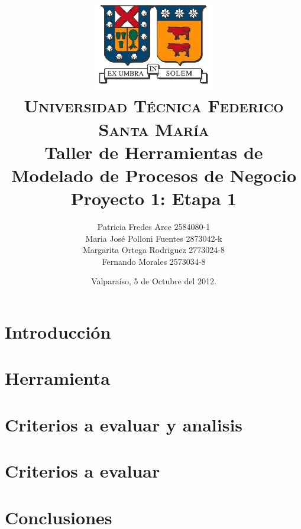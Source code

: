 \documentclass[letterpaper,12pt,spanish]{article}
\author{
{\normalsize Patricia Fredes Arce 2584080-1}\\
{\normalsize Maria José Polloni Fuentes 2873042-k}\\
{\normalsize Margarita Ortega Rodriguez 2773024-8}\\
{\normalsize Fernando Morales 2573034-8}\\
}
\title{\vspace{-1cm}\includegraphics[scale=0.5]{imagenes/logo_usm.JPG}\\\vspace{-0.2cm}
    {\small \scshape Universidad T\'ecnica Federico Santa Mar\'ia}\\
    \vspace{1cm}
    {\bfseries Taller de Herramientas de Modelado de Procesos de Negocio} \\ {\Large Proyecto 1: Etapa 1} \\\vspace{0.2cm}{\normalsize Viktor Tapia}
}
\date{Valpara\'iso, 5 de Octubre del 2012.}
\begin{document}
\maketitle
\thispagestyle{empty}
\newpage
\tableofcontents
\newpage

\section{Introducción}


\section{Herramienta}


\section{Criterios a evaluar y analisis}


\section{Criterios a evaluar}


\section{Conclusiones}




 
\end{document}
